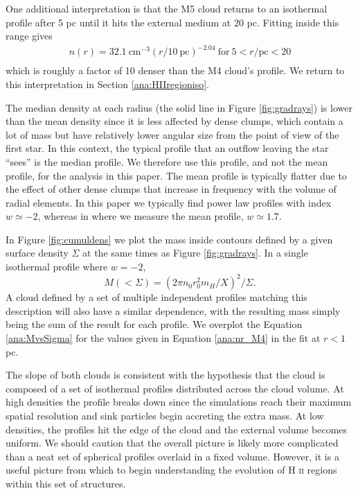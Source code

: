 \documentclass[a4paper,fleqn,usenatbib]{mnras}
\newcommand{\HII}{H \textsc{ii}\xspace}
\begin{document}
One additional interpretation is that the M5 cloud returns to an isothermal profile after 5 pc until it hits the external medium at 20 pc. Fitting inside this range gives
\begin{equation}
\begin{split}
n(r) = 32.1~\mathrm{cm}^{-3} (r / 10~\mathrm{pc})^{-2.04}~\mathrm{for}~ 5 < r/\mathrm{pc}< 20 \\
\end{split}
\label{ana:nr_M5_20pc}
\end{equation}
which is roughly a factor of 10 denser than the M4 cloud's profile. We return to this interpretation in Section \ref{ana:HIIregioniso}.

The median density at each radius (the solid line in Figure \ref{fig:gradrays}) is lower than the mean density since it is less affected by dense clumps, which contain a lot of mass but have relatively lower angular size from the point of view of the first star. In this context, the typical profile that an outflow leaving the star ``sees'' is the median profile. We therefore use this profile, and not the mean profile, for the analysis in this paper. The mean profile is typically flatter due to the effect of other dense clumps that increase in frequency with the volume of radial elements. In this paper we typically find power law profiles with index $w\simeq-2$, whereas in \cite{Geen2018} where we measure the mean profile, $w \simeq 1.7$.

In Figure \ref{fig:cumuldens} we plot the mass inside contours defined by a given surface density $\Sigma$ at the same times as Figure \ref{fig:gradrays}. In a single isothermal profile where $w=-2$, 
\begin{equation}
M(<\Sigma) = (2 \pi n_0 r_0^2 m_H / X)^2 / \Sigma.
\label{ana:MvsSigma}
\end{equation}
A cloud defined by a set of multiple independent profiles matching this description will also have a similar dependence, with the resulting mass simply being the sum of the result for each profile. We overplot the Equation \ref{ana:MvsSigma} for the values given in Equation \ref{ana:nr_M4} in the fit at $r < 1$ pc.

The slope of both clouds is consistent with the hypothesis that the cloud is composed of a set of isothermal profiles distributed across the cloud volume. At high densities the profile breaks down since the simulations reach their maximum spatial resolution and sink particles begin accreting the extra mass. At low densities, the profiles hit the edge of the cloud and the external volume becomes uniform. We should caution that the overall picture is likely more complicated than a neat set of spherical profiles overlaid in a fixed volume. However, it is a useful picture from which to begin understanding the evolution of \HII regions within this set of structures.
\end{document}
